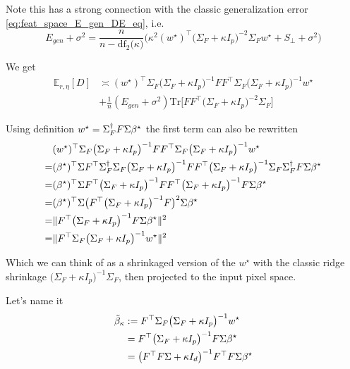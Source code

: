 Note this has a strong connection with the classic generalization
error \ref{eq:feat_space_E_gen_DE_eq}, i.e.
\[
E_{gen}+\sigma^{2}=\frac{n}{n-\mathrm{df}_{2}\bigl(\kappa\bigr)}\Big(\kappa^{2}(w^{\star})^{\top}\bigl(\Sigma_{F}+\kappa I_{p}\bigr)^{-2}\Sigma_{F}w^{\star}+S_{\perp}+\sigma^{2}\Big)
\]

We get
\begin{align}
\mathbb{E}_{r,\eta}[D] & \asymp(w^{\star})^{\top}\Sigma_{F}\bigl(\Sigma_{F}+\kappa I_{p}\bigr)^{-1}FF^{\top}\Sigma_{F}\bigl(\Sigma_{F}+\kappa I_{p}\bigr)^{-1}w^{\star}\nonumber \\
 & +\frac{1}{n}(E_{gen}+\sigma^{2})\mbox{Tr}\bigl[FF^{\top}\bigl(\Sigma_{F}+\kappa I_{p}\bigr)^{-2}\Sigma_{F}\bigr]\label{eq:feat_space_acc_D_expectation_func_of_E_gen}
\end{align}

Using definition $w^{\star}=\Sigma_{F}^{\dagger}F\Sigma{\beta^{\star}}$
the first term can also be rewritten
\begin{align*}
 & (w^{\star})^{\top}\Sigma_{F}\bigl(\Sigma_{F}+\kappa I_{p}\bigr)^{-1}FF^{\top}\Sigma_{F}\bigl(\Sigma_{F}+\kappa I_{p}\bigr)^{-1}w^{\star}\\
= & ({\beta^{\star}})^{\top}\Sigma F^{\top}\Sigma_{F}^{\dagger}\Sigma_{F}\bigl(\Sigma_{F}+\kappa I_{p}\bigr)^{-1}FF^{\top}\bigl(\Sigma_{F}+\kappa I_{p}\bigr)^{-1}\Sigma_{F}\Sigma_{F}^{\dagger}F\Sigma{\beta^{\star}}\\
= & ({\beta^{\star}})^{\top}\Sigma F^{\top}\bigl(\Sigma_{F}+\kappa I_{p}\bigr)^{-1}FF^{\top}\bigl(\Sigma_{F}+\kappa I_{p}\bigr)^{-1}F\Sigma{\beta^{\star}}\\
= & ({\beta^{\star}})^{\top}\Sigma\big(F^{\top}\bigl(\Sigma_{F}+\kappa I_{p}\bigr)^{-1}F\big)^{2}\Sigma{\beta^{\star}}\\
= & \|F^{\top}\bigl(\Sigma_{F}+\kappa I_{p}\bigr)^{-1}F\Sigma{\beta^{\star}}\|^{2}\\
= & \|F^{\top}\Sigma_{F}\bigl(\Sigma_{F}+\kappa I_{p}\bigr)^{-1}w^{\star}\|^{2}
\end{align*}

Which we can think of as a shrinkaged version of the $w^{\star}$
with the classic ridge shrinkage $\bigl(\Sigma_{F}+\kappa I_{p}\bigr)^{-1}\Sigma_{F}$,
then projected to the input pixel space.

Let's name it
\begin{align}
\tilde{\beta}_{\kappa} & :=F^{\top}\Sigma_{F}\bigl(\Sigma_{F}+\kappa I_{p}\bigr)^{-1}w^{\star}\nonumber \\
 & =F^{\top}\bigl(\Sigma_{F}+\kappa I_{p}\bigr)^{-1}F\Sigma{\beta^{\star}}\nonumber \\
 & =\bigl(F^{\top}F\Sigma+\kappa I_{d}\bigr)^{-1}F^{\top}F\Sigma{\beta^{\star}}\label{eq:feat_regr_shrinkage_effective_weight}
\end{align}

